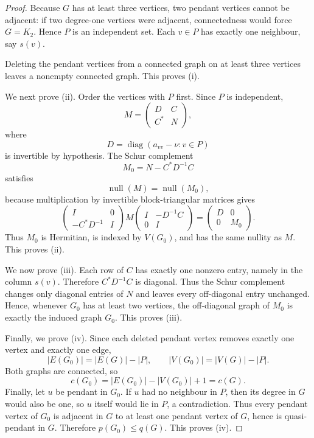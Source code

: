 \documentclass[12pt]{article}
\theoremstyle{remark}
\newcommand{\nullity}{\operatorname{null}}
\begin{document}
\begin{proof}
Because $G$ has at least three vertices, two pendant vertices cannot be adjacent: if two degree-one vertices were adjacent, connectedness would force $G=K_2$.  Hence $P$ is an independent set.  Each $v\in P$ has exactly one neighbour, say $s(v)$.

Deleting the pendant vertices from a connected graph on at least three vertices leaves a nonempty connected graph.  This proves (i).

We next prove (ii).
Order the vertices with $P$ first.  Since $P$ is independent,
\[
M=
\begin{pmatrix}
D&C\\
C^*&N
\end{pmatrix},
\]
where
\[
D=\operatorname{diag}(a_{vv}-\nu:v\in P)
\]
is invertible by hypothesis.  The Schur complement
\[
M_0=N-C^*D^{-1}C
\]
satisfies
\[
\nullity(M)=\nullity(M_0),
\]
because multiplication by invertible block-triangular matrices gives
\[
\begin{pmatrix}I&0\\-C^*D^{-1}&I\end{pmatrix}
M
\begin{pmatrix}I&-D^{-1}C\\0&I\end{pmatrix}
=
\begin{pmatrix}D&0\\0&M_0\end{pmatrix}.
\]
Thus $M_0$ is Hermitian, is indexed by $V(G_0)$, and has the same nullity as $M$.  This proves (ii).

We now prove (iii).
Each row of $C$ has exactly one nonzero entry, namely in the column $s(v)$.  Therefore $C^*D^{-1}C$ is diagonal.  Thus the Schur complement changes only diagonal entries of $N$ and leaves every off-diagonal entry unchanged.  Hence, whenever $G_0$ has at least two vertices, the off-diagonal graph of $M_0$ is exactly the induced graph $G_0$.
This proves (iii).

Finally, we prove (iv).
Since each deleted pendant vertex removes exactly one vertex and exactly one edge,
\[
|E(G_0)|=|E(G)|-|P|,
\qquad
|V(G_0)|=|V(G)|-|P|.
\]
Both graphs are connected, so
\[
c(G_0)=|E(G_0)|-|V(G_0)|+1=c(G).
\]
Finally, let $u$ be pendant in $G_0$.  If $u$ had no neighbour in $P$, then its degree in $G$ would also be one, so $u$ itself would lie in $P$, a contradiction.  Thus every pendant vertex of $G_0$ is adjacent in $G$ to at least one pendant vertex of $G$, hence is quasi-pendant in $G$.  Therefore $p(G_0)\le q(G)$.
This proves (iv).
\end{proof}
\end{document}
